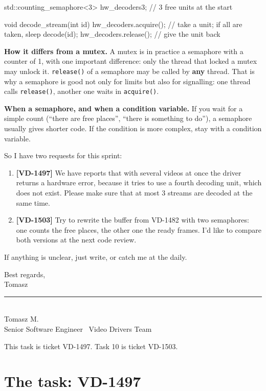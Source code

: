 \begin{email}
\begin{code}
std::counting_semaphore<3> hw_decoders{3};   // 3 free units at the start

void decode_stream(int id) {
    hw_decoders.acquire();    // take a unit; if all are taken, sleep
    decode(id);
    hw_decoders.release();    // give the unit back
}
\end{code}

\textbf{How it differs from a mutex.} A mutex is in practice a semaphore with a counter of 1, with one important
difference: only the thread that locked a mutex may unlock it. \texttt{release()} of a semaphore may be called by
\textbf{any} thread. That is why a semaphore is good not only for limits but also for signalling: one thread calls
\texttt{release()}, another one waits in \texttt{acquire()}.

\textbf{When a semaphore, and when a condition variable.} If you wait for a simple count (``there are free places'',
``there is something to do''), a semaphore usually gives shorter code. If the condition is more complex, stay with
a condition variable.

So I have two requests for this sprint:
\begin{enumerate}
  \item \textbf{[VD-1497]} We have reports that with several videos at once the driver returns a hardware error,
        because it tries to use a fourth decoding unit, which does not exist. Please make sure that at most 3 streams
        are decoded at the same time.
  \item \textbf{[VD-1503]} Try to rewrite the buffer from VD-1482 with two semaphores: one counts the free places,
        the other one the ready frames. I'd like to compare both versions at the next code review.
\end{enumerate}

If anything is unclear, just write, or catch me at the daily.

Best regards,\\
Tomasz

\textcolor{nLine}{\rule{2cm}{0.4pt}}\\
{\small\textcolor{nInk}{Tomasz M.\\ Senior Software Engineer \textbullet\ Video Drivers Team}}
\end{email}

This task is ticket VD-1497. Task 10 is ticket VD-1503.

\section{The task: VD-1497}

